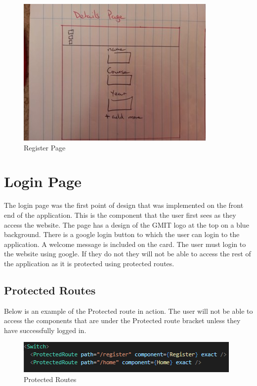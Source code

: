 \begin{figure}[p]
    \centering
    \includegraphics{img/Register.jpg}
    \caption{Register Page}
    \label{fig:my_label}
\end{figure}
\clearpage


\section{Login Page}
The login page was the first point of design that was implemented on the front end of the application. This is the component that the user first sees as they access the website. The page has a design of the GMIT logo at the top on a blue background. There is a google login button to which the user can login to the application. A welcome message is included on the card. The user must login to the website using google. If they do not they will not be able to access the rest of the application as it is protected using protected routes. \\

\subsection{Protected Routes}
Below is an example of the Protected route in action. The user will not be able to access the components that are under the Protected route bracket unless they have successfully logged in. \\
\begin{figure}[h]
    \centering
    \includegraphics{img/protectedRoute.png}
    \caption{Protected Routes}
    \label{fig:my_label}
\end{figure}

